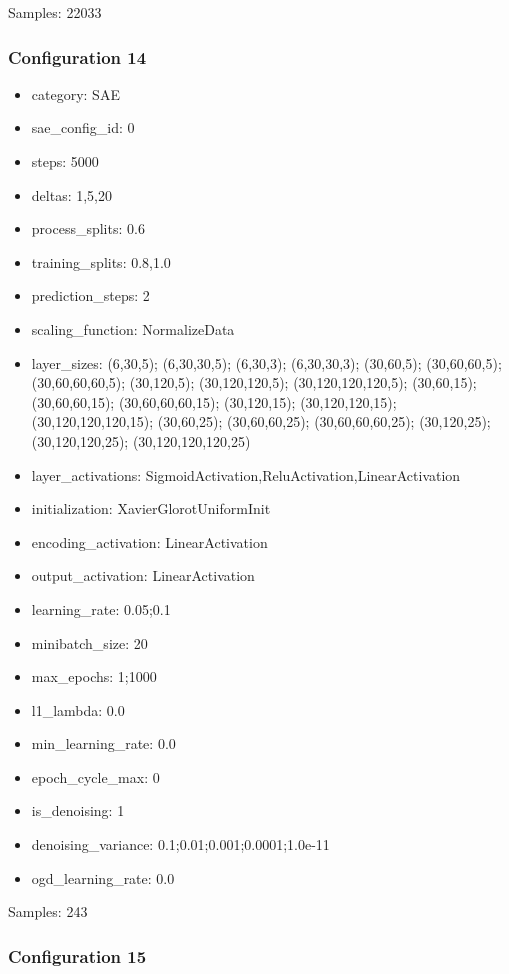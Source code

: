 \documentclass[a4paper,11pt,oneside]{article}
\theoremstyle{plain}
\theoremstyle{definition}
\begin{document}
Samples: 22033

\subsubsection{Configuration 14}\label{config14}
\begin{itemize}
	\item category: SAE
	\item sae\_config\_id: 0
	\item steps: 5000
	\item deltas: 1,5,20
	\item process\_splits: 0.6
	\item training\_splits: 0.8,1.0
	\item prediction\_steps: 2
	\item scaling\_function: NormalizeData
	\item layer\_sizes: (6,30,5); (6,30,30,5); (6,30,3); (6,30,30,3); (30,60,5); (30,60,60,5); (30,60,60,60,5); (30,120,5); (30,120,120,5); (30,120,120,120,5); (30,60,15); (30,60,60,15); (30,60,60,60,15); (30,120,15); (30,120,120,15); (30,120,120,120,15); (30,60,25); (30,60,60,25); (30,60,60,60,25); (30,120,25); (30,120,120,25); (30,120,120,120,25)
	\item layer\_activations: SigmoidActivation,ReluActivation,LinearActivation
	\item initialization: XavierGlorotUniformInit
	\item encoding\_activation: LinearActivation
	\item output\_activation: LinearActivation
	\item learning\_rate: 0.05;0.1
	\item minibatch\_size: 20
	\item max\_epochs: 1;1000
	\item l1\_lambda: 0.0
	\item min\_learning\_rate: 0.0
	\item epoch\_cycle\_max: 0
	\item is\_denoising: 1
	\item denoising\_variance: 0.1;0.01;0.001;0.0001;1.0e-11
	\item ogd\_learning\_rate: 0.0
\end{itemize}

Samples: 243

\subsubsection{Configuration 15}\label{config15}
\end{document}
